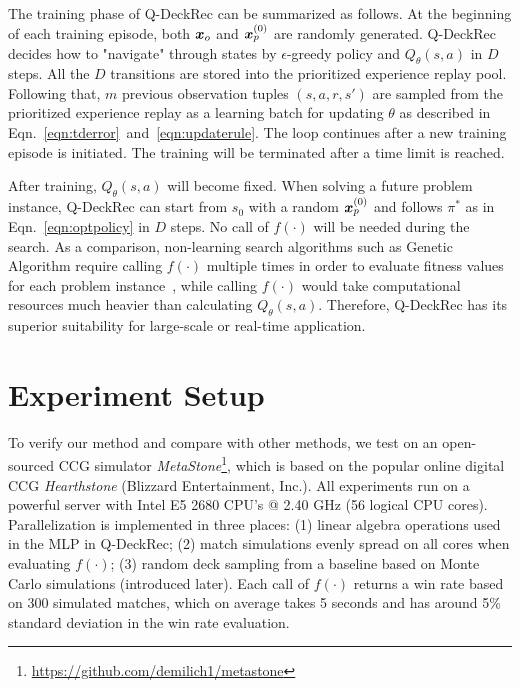 The training phase of Q-DeckRec can be summarized as follows. At the beginning of each training episode, both $\boldsymbol{x}_o$ and $\boldsymbol{x}_p^{(0)}$ are randomly generated. Q-DeckRec decides how to "navigate" through states by $\epsilon$-greedy policy and $Q_\theta(s,a)$ in $D$ steps. All the $D$ transitions are stored into the prioritized experience replay pool. Following that, $m$ previous observation tuples $(s, a, r, s')$ are sampled from the prioritized experience replay as a learning batch for updating $\theta$ as described in Eqn.~\ref{eqn:tderror}~and~\ref{eqn:updaterule}. The loop continues after a new training episode is initiated. The training will be terminated after a time limit is reached. 

After training, $Q_\theta(s,a)$ will become fixed. When solving a future problem instance, Q-DeckRec can start from $s_0$ with a random $\boldsymbol{x}_p^{(0)}$ and follows $\pi^*$ as in Eqn.~\ref{eqn:optpolicy} in $D$ steps. No call of $f(\cdot)$ will be needed during the search. As a comparison, non-learning search algorithms such as Genetic Algorithm require calling $f(
\cdot)$ multiple times in order to evaluate fitness values for each problem instance~\cite{garcia2016evolutionary,bjorke2017deckbuilding}, while calling $f(\cdot)$ would take computational resources much heavier than calculating $Q_\theta(s,a)$. Therefore, Q-DeckRec has its superior suitability for large-scale or real-time application.







\section{Experiment Setup}\label{sec:qdeckrec_exp}
To verify our method and compare with other methods, we test on an open-sourced CCG simulator \textit{MetaStone}\footnote{\url{https://github.com/demilich1/metastone}}, which is  based on the popular online digital CCG \textit{Hearthstone} (Blizzard Entertainment, Inc.). All experiments run on a powerful server with Intel E5 2680 CPU’s @ 2.40 GHz (56 logical CPU cores). Parallelization is implemented in three places: (1) linear algebra operations used in the MLP in Q-DeckRec; (2) match simulations evenly spread on all cores when evaluating $f(\cdot)$; (3) random deck sampling from a baseline based on Monte Carlo simulations (introduced later). Each call of $f(\cdot)$ returns a win rate based on 300 simulated matches, which on average takes 5 seconds and has around 5\% standard deviation in the win rate evaluation. 


